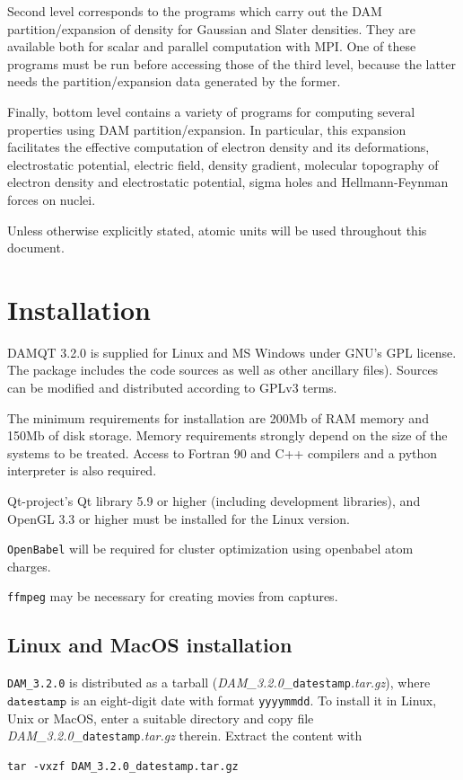 \documentclass[10pt]{article}
\begin{document}
Second level corresponds to the programs which carry out the
DAM partition/expansion of density for Gaussian and Slater densities. They are available both for scalar and parallel 
computation with MPI. One of these programs must be run before accessing those of the third level,
because the latter needs the partition/expansion data generated by the former. 

Finally, bottom level contains a variety of programs for computing several properties
using DAM partition/expansion. In particular, this expansion facilitates the effective computation of electron density and its deformations,
electrostatic potential, electric field, density gradient, molecular topography of electron density and electrostatic potential, 
sigma holes and Hellmann-Feynman forces on nuclei.

Unless otherwise explicitly stated, atomic units will be used throughout this
document.

\newpage

\section{Installation \label{sec:1}}

DAMQT 3.2.0 is supplied for Linux and MS Windows under GNU's GPL license. 
The package includes the code sources as well as other ancillary files). 
Sources can be modified and distributed according to GPLv3 terms.

The minimum requirements for installation are 200Mb of RAM memory and 150Mb of
disk storage. Memory requirements strongly depend on the size of the systems to be 
treated. Access to Fortran 90 and C++ compilers and a python interpreter is also required. 

Qt-project's Qt library 5.9 or higher (including development libraries), and OpenGL 3.3 or higher must be installed for the Linux version. 

\texttt{OpenBabel} will be required for cluster optimization using openbabel atom charges.

\texttt{ffmpeg} may be necessary for creating movies from captures.

\subsection{Linux and MacOS installation \label{sec:1.1}}

\texttt{DAM\_3.2.0} is distributed as a tarball ({\it DAM\_3.2.0\_}\texttt{datestamp}{\it .tar.gz}),
where $\texttt{datestamp}$ is an eight-digit date with format \texttt{yyyymmdd}.
To install it in Linux, Unix or MacOS, enter a suitable directory and copy file 
{\it DAM\_3.2.0\_}\texttt{datestamp}{\it .tar.gz}
therein. Extract the content with
\begin{verbatim}
tar -vxzf DAM_3.2.0_datestamp.tar.gz
\end{verbatim}
\end{document}
